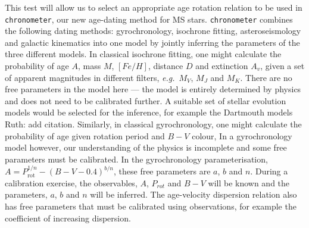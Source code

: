 \documentclass[12pt]{article}
\newcommand{\racomment}[1]{{\color{red}#1}}
\newcommand{\av}{$A_v$}
\newcommand{\eg}{{\it e.g.}}
\newcommand{\feh}{$[Fe/H]$}
\begin{document}
This test will allow us to select an appropriate age rotation relation to be
used in {\tt chronometer}, our new age-dating method for MS stars.
{\tt chronometer} combines the following dating methods: gyrochronology,
isochrone fitting, asteroseismology and galactic kinematics into one model by
jointly inferring the parameters of the three different models.
In classical isochrone fitting, one might calculate the probability of age
$A$, mass $M$, \feh, distance $D$ and extinction \av, given a set of
apparent magnitudes in different filters, \eg\ $M_V$, $M_J$ and $M_K$.
There are no free parameters in the model here --- the model is entirely
determined by physics and does not need to be calibrated further.
A suitable set of stellar evolution models would be selected for the
inference, for example the Dartmouth models
\racomment{Ruth: add citation}.
Similarly, in classical gyrochronology, one might calculate the probability of
age given rotation period and $B-V$ colour,
In a gyrochronology model however, our understanding of the physics is
incomplete and some free parameters must be calibrated.
In the \citet{barnes2003} gyrochronology parameterisation, $A =
P_{\mathrm{rot}}^{1/n} - (B-V-0.4)^{b/n}$, these free parameters are $a$, $b$
and $n$.
During a calibration exercise, the observables, $A$, $P_{rot}$ and $B-V$ will
be known and the parameters, $a$, $b$ and $n$ will be inferred.
The age-velocity dispersion relation also has free parameters that must be
calibrated using observations, for example the coefficient of increasing
dispersion.
\end{document}
